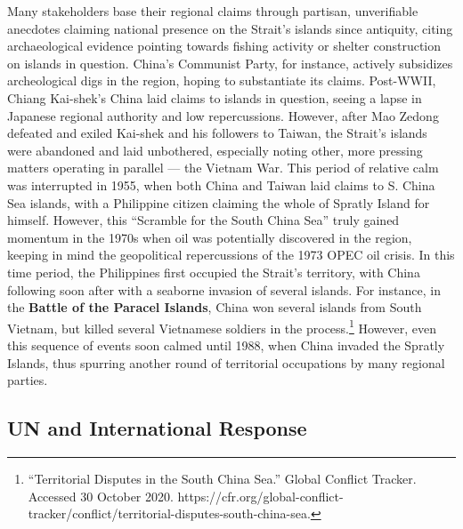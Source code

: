 \documentclass[10pt, letterpaper]{article}
\begin{document}
 Many stakeholders base their regional claims through partisan,
unverifiable anecdotes claiming national presence on the Strait's
islands since antiquity, citing archaeological evidence pointing towards
fishing activity or shelter construction on islands in question. China's
Communist Party, for instance, actively subsidizes archeological digs in
the region, hoping to substantiate its claims. Post-WWII, Chiang
Kai-shek's China laid claims to islands in question, seeing a lapse in
Japanese regional authority and low repercussions. However, after Mao
Zedong defeated and exiled Kai-shek and his followers to Taiwan, the
Strait's islands were abandoned and laid unbothered, especially noting
other, more pressing matters operating in parallel --- the Vietnam War.
This period of relative calm was interrupted in 1955, when both China
and Taiwan laid claims to S. China Sea islands, with a Philippine
citizen claiming the whole of Spratly Island for himself. However, this
``Scramble for the South China Sea'' truly gained momentum in the 1970s
when oil was potentially discovered in the region, keeping in mind the
geopolitical repercussions of the 1973 OPEC oil crisis. In this time
period, the Philippines first occupied the Strait's territory, with
China following soon after with a seaborne invasion of several islands.
For instance, in the \textbf{Battle of the Paracel Islands}, China won
several islands from South Vietnam, but killed several Vietnamese
soldiers in the process.\footnote{``Territorial Disputes in the South
  China Sea.'' Global Conflict Tracker. Accessed 30 October 2020.
  https://cfr.org/global-conflict-tracker/conflict/territorial-disputes-south-china-sea.}
However, even this sequence of events soon calmed until 1988, when China
invaded the Spratly Islands, thus spurring another round of territorial
occupations by many regional parties. \\

\subsection{UN and International Response}
\end{document}
